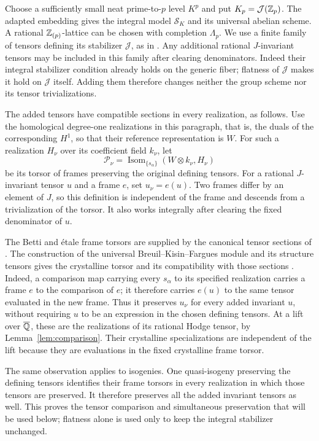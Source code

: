Choose a sufficiently small neat prime-to-$p$ level $K^p$ and put
$K_p=\mathcal J(\mathbb Z_p)$.  The adapted embedding gives the integral
model $\mathcal S_K$ and its universal abelian scheme.  A rational
$\mathbb Z_{(p)}$-lattice can be chosen with completion $\Lambda_p$.
We use a finite family of tensors defining its stabilizer
$\mathcal J$, as in \cite[\S2.1.4]{KisinZhou2025}.
Any additional rational $J$-invariant tensors may be included in
this family after clearing denominators.  Indeed their integral
stabilizer condition already holds on the generic fiber; flatness
of $\mathcal J$ makes it hold on $\mathcal J$ itself.  Adding them
therefore changes neither the group scheme nor its tensor
trivializations.

The added tensors have compatible sections in every realization, as
follows.  Use the homological degree-one realizations in this paragraph,
that is, the duals of the corresponding $H^1$, so that their reference
representation is $W$.  For such a realization $H_\nu$ over its
coefficient field $k_\nu$, let
\[
 \mathcal P_\nu=\operatorname{Isom}_{\{s_\alpha\}}
                    (W\otimes k_\nu,H_\nu)
\]
be its torsor of frames preserving the original defining tensors.
For a rational $J$-invariant tensor $u$ and a frame $e$, set
$u_\nu=e(u)$.  Two frames differ by an element of $J$, so this
definition is independent of the frame and descends from a
trivialization of the torsor.  It also works integrally after clearing
the fixed denominator of $u$.

The Betti and \'etale frame torsors are supplied by the canonical
tensor sections of \cite[\S2.1.4]{KisinZhou2025}.  The construction
of the universal Breuil--Kisin--Fargues module and its structure
tensors gives the crystalline torsor and its compatibility with
those sections
\cite[\S\S2.1.13--2.1.14]{KisinZhou2025}.
Indeed, a comparison map carrying every $s_\alpha$ to its specified
realization carries a frame $e$ to the comparison of $e$; it therefore
carries $e(u)$ to the same tensor evaluated in the new frame.
Thus it preserves $u_\nu$ for every added invariant $u$, without
requiring $u$ to be an expression in the chosen defining tensors.
At a lift over $\overline{\mathbb Q}$, these are the realizations of its rational
Hodge tensor, by Lemma~\ref{lem:comparison}.  Their crystalline
specializations are independent of the lift because they are
evaluations in the fixed crystalline frame torsor.

The same observation applies to isogenies.  One quasi-isogeny
preserving the defining tensors identifies their frame torsors in
every realization in which those tensors are preserved.  It
therefore preserves all the added invariant tensors as well.
This proves the tensor comparison and simultaneous preservation
that will be used below; flatness alone is used only to keep the
integral stabilizer unchanged.

